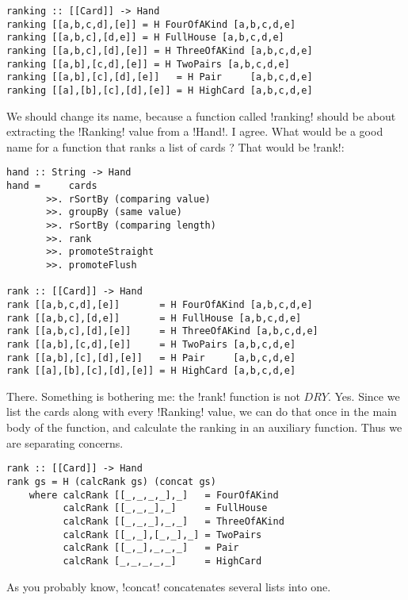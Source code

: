\begin{lstlisting}[frame=single]
ranking :: [[Card]] -> Hand
ranking [[a,b,c,d],[e]] = H FourOfAKind [a,b,c,d,e]
ranking [[a,b,c],[d,e]] = H FullHouse [a,b,c,d,e]
ranking [[a,b,c],[d],[e]] = H ThreeOfAKind [a,b,c,d,e]
ranking [[a,b],[c,d],[e]] = H TwoPairs [a,b,c,d,e]
ranking [[a,b],[c],[d],[e]]   = H Pair     [a,b,c,d,e]
ranking [[a],[b],[c],[d],[e]] = H HighCard [a,b,c,d,e] 
\end{lstlisting}
\lhN We should change its name, because a function called \il!ranking! should be about extracting the \il!Ranking! value from a \il!Hand!. 
\lhA I agree.
\lhN What would be a good name for a function that ranks a list of cards ?
\lhA That would be \il!rank!:
\begin{lstlisting}[frame=single]
hand :: String -> Hand
hand =     cards
       >>. rSortBy (comparing value)
       >>. groupBy (same value)
       >>. rSortBy (comparing length)
       >>. rank
       >>. promoteStraight
       >>. promoteFlush    

rank :: [[Card]] -> Hand
rank [[a,b,c,d],[e]]       = H FourOfAKind [a,b,c,d,e]
rank [[a,b,c],[d,e]]       = H FullHouse [a,b,c,d,e]
rank [[a,b,c],[d],[e]]     = H ThreeOfAKind [a,b,c,d,e]
rank [[a,b],[c,d],[e]]     = H TwoPairs [a,b,c,d,e]
rank [[a,b],[c],[d],[e]]   = H Pair     [a,b,c,d,e]
rank [[a],[b],[c],[d],[e]] = H HighCard [a,b,c,d,e] 
\end{lstlisting}
\success There.
\newpage \lhN Something is bothering me: the \il!rank! function is not $DRY$.
\lhA Yes. Since we list the cards along with every \il!Ranking! value, we can do that once in the main body of the function, and calculate the ranking in an auxiliary function. Thus we are separating concerns.
\begin{lstlisting}[frame=single]
rank :: [[Card]] -> Hand
rank gs = H (calcRank gs) (concat gs)  
    where calcRank [[_,_,_,_],_]   = FourOfAKind 
          calcRank [[_,_,_],_]     = FullHouse
          calcRank [[_,_,_],_,_]   = ThreeOfAKind
          calcRank [[_,_],[_,_],_] = TwoPairs
          calcRank [[_,_],_,_,_]   = Pair    
          calcRank [_,_,_,_,_]     = HighCard 
\end{lstlisting}
\success As you probably know, \il!concat! concatenates several lists into one.

